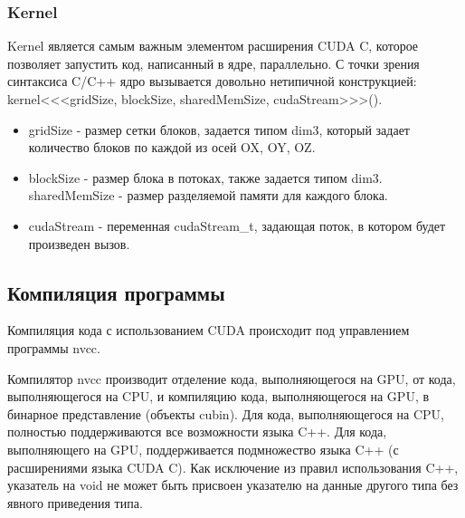 \documentclass[a4paper, 12pt]{article}
\begin{document}
\subsubsection{Kernel}
Kernel является самым важным элементом расширения CUDA C, 
которое позволяет запустить код, написанный в ядре, параллельно. С точки 
зрения синтаксиса C/C++ ядро вызывается довольно нетипичной 
конструкцией:
kernel<<<gridSize, blockSize, \newline sharedMemSize, cudaStream>>>().
\begin{itemize}

\item gridSize - размер сетки блоков, задается типом dim3, который задает 
количество блоков по каждой из осей OX, OY, OZ.
\item blockSize - размер блока в потоках, также задается типом dim3.
sharedMemSize - размер разделяемой памяти для каждого блока.
\item cudaStream - переменная cudaStream\_t, задающая поток, в котором 
будет произведен вызов.
\end{itemize}

    \clearpage
    \subsection{Компиляция программы}
     Компиляция кода с использованием CUDA происходит под управлением программы nvcc.
    
     Компилятор nvcc производит отделение кода, выполняющегося на GPU, от кода, выполняющегося на CPU, и компиляцию кода, выполняющегося на GPU, в бинарное представление (объекты cubin). Для кода, выполняющегося на CPU, полностью поддерживаются все возможности языка C++. Для кода, выполняющего на GPU, поддерживается подмножество языка C++ (с расширениями языка CUDA C). Как исключение из правил использования C++, указатель на void не может быть присвоен указателю на данные другого типа без явного приведения типа. 
    
\end{document}
